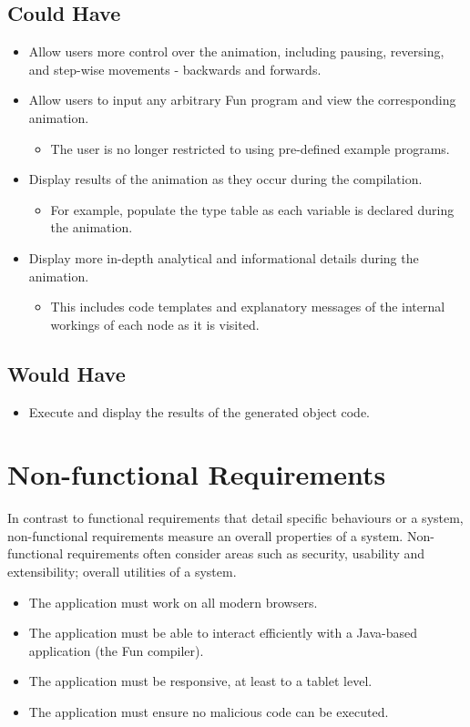 \documentclass{l4proj}
\begin{document}
\subsection{Could Have}
\begin{itemize}
\item Allow users more control over the animation, including pausing, reversing, and step-wise movements - backwards and forwards.
\item Allow users to input any arbitrary Fun program and view the corresponding animation.
\begin{itemize}
\item The user is no longer restricted to using pre-defined example programs.
\end{itemize}
\item Display results of the animation as they occur during the compilation.
\begin{itemize}
\item For example, populate the type table as each variable is declared during the animation.
\end{itemize}
\item Display more in-depth analytical and informational details during the animation.
\begin{itemize}
\item This includes code templates and explanatory messages of the internal workings of each node as it is visited.
\end{itemize}
\end{itemize}
\subsection{Would Have}
\begin{itemize}
\item Execute and display the results of the generated object code.
\end{itemize}

\section{Non-functional Requirements}
In contrast to functional requirements that detail specific behaviours or a system, non-functional requirements measure an overall properties of a system. Non-functional requirements often consider areas such as security, usability and extensibility; overall utilities of a system.

\begin{itemize}
\item The application must work on all modern browsers.
\item The application must be able to interact efficiently with a Java-based application (the Fun compiler).
\item The application must be responsive, at least to a tablet level.
\item The application must ensure no malicious code can be executed.
\end{itemize}

\begin{appendices}

\end{appendices}




\end{document}
